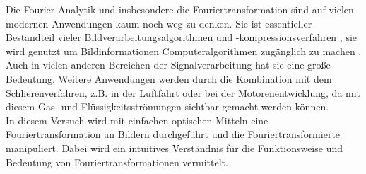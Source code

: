 
Die Fourier-Analytik und insbesondere die Fouriertransformation sind auf vielen modernen Anwendungen kaum noch weg zu denken. Sie ist essentieller Bestandteil vieler Bildverarbeitungsalgorithmen \cite{easton_fourier_2010} und -kompressionsverfahren \cite{_jpeg_2015}, sie wird genutzt um Bildinformationen Computeralgorithmen zugänglich zu machen \cite{prof._dr._norbert_link_vorlesungsscript:_????}. Auch in vielen anderen Bereichen der Signalverarbeitung hat sie eine große Bedeutung. Weitere Anwendungen werden durch die Kombination mit dem Schlierenverfahren, z.B. in der Luftfahrt oder bei der Motorenentwicklung, da mit diesem Gas- und Flüssigkeitsströmungen sichtbar gemacht werden können.\\

In diesem Versuch wird mit einfachen optischen Mitteln eine Fouriertransformation an Bildern durchgeführt und die Fouriertransformierte manipuliert. Dabei wird ein intuitives Verständnis für die Funktionsweise und Bedeutung von Fouriertransformationen vermittelt.